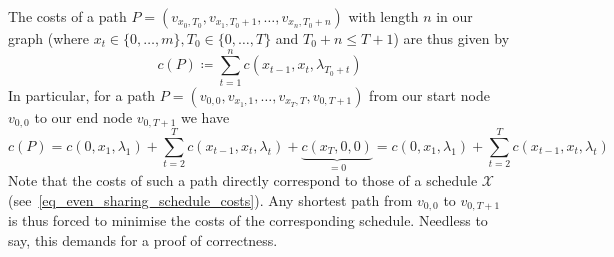 \documentclass[hidelinks]{article}
\theoremstyle{plain}
\theoremstyle{definition}
\theoremstyle{rem}
\newcommand{\mx}{\mathcal{X}}
\newcommand{\costs}{c}
\newcommand{\fromto}[2]{\{#1,\ldots,#2\}}
\begin{document}
The costs of a path $P=(v_{x_0,T_0},v_{x_1,T_0+1},\ldots,v_{x_n,T_0+n})$ with length $n$ in our graph (where $x_t\in\fromto{0}{m}, T_0\in\fromto{0}{T}$ and $T_0+n\leq T+1$) are thus given by
\begin{equation*}
	\costs(P)\coloneqq\sum\limits_{t=1}^{n}\costs(x_{t-1},x_t,\lambda_{T_0+t})
\end{equation*}
In particular, for a path $P=(v_{0,0},v_{x_1,1},\ldots,v_{x_T,T},v_{0,T+1})$ from our start node $v_{0,0}$ to our end node $v_{0,T+1}$ we have
\begin{equation}
	\costs(P)=\costs(0,x_1,\lambda_1)+\sum\limits_{t=2}^{T}\costs(x_{t-1},x_{t},\lambda_{t})+\underbrace{\costs(x_T,0,0)}_{=0}=\costs(0,x_1,\lambda_1)+\sum\limits_{t=2}^{T}\costs(x_{t-1},x_{t},\lambda_{t})\label{eq_v0_VT1_path_costs}
\end{equation}
Note that the costs of such a path directly correspond to those of a schedule $\mx$ (see~\eqref{eq_even_sharing_schedule_costs}).
Any shortest path from $v_{0,0}$ to $v_{0,T+1}$ is thus forced to minimise the costs of the corresponding schedule. Needless to say, this demands for a proof of correctness.
\end{document}
